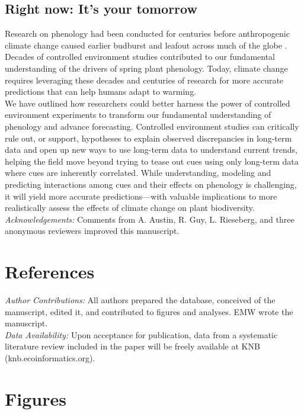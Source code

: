 \documentclass[11pt,letter]{article}
\begin{document}
\subsection{Right now: It's your tomorrow}
Research on phenology had been conducted for centuries before anthropogenic climate change caused earlier budburst and leafout across much of the globe \citep{Lamb:1948aa,Sparks:1995mv}. Decades of controlled environment studies contributed to our fundamental understanding of the drivers of spring plant phenology. Today, climate change requires leveraging these decades and centuries of research for more accurate predictions that can help humans adapt to warming. \\

We have outlined how researchers could better harness the power of controlled environment experiments to transform our fundamental understanding of phenology and advance forecasting. Controlled environment studies can critically rule out, or support, hypotheses to explain observed discrepancies in long-term data and open up new ways to use long-term data to understand current trends, helping the field move beyond trying to tease out cues using only long-term data where cues are inherently correlated. While understanding, modeling and predicting interactions among cues and their effects on phenology is challenging, it will yield more accurate predictions---with valuable implications to more realistically assess the effects of climate change on plant biodiversity.\\

\emph{Acknowledgements:} Comments from A. Austin, R. Guy, L. Rieseberg, and three anonymous reviewers improved this manuscript.\\
\clearpage

\section{References}

\clearpage
\emph{Author Contributions:} All authors prepared the database, conceived of the manuscript, edited it, and contributed to figures and analyses. EMW wrote the manuscript.\\

\emph{Data Availability:} Upon acceptance for publication, data from a systematic literature review included in the paper will be freely available at KNB (knb.ecoinformatics.org).\\
\section{Figures}
\clearpage
\end{document}
